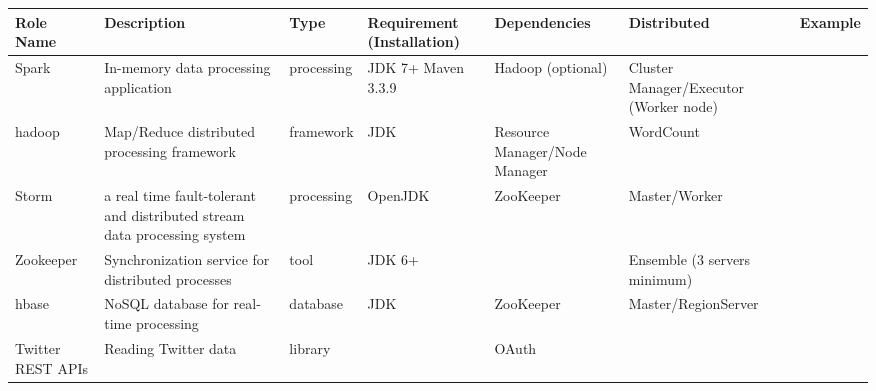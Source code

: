 \documentclass[9pt,twocolumn,twoside]{styles/osajnl}
\begin{document}
\begin{table}[htb]
  \begin{center}
    \begin{small}
      \begin{tabular}{l|m{3cm}|l|m{2cm}|m{2cm}|m{2cm}|m{2cm}}

	Role Name & Description & Type & Requirement (Installation) & Dependencies & Distributed & Example \tabularnewline \hline \hline
	Spark & In-memory data processing application & processing & JDK 7+ Maven 3.3.9 & Hadoop (optional) & 	Cluster Manager/Executor (Worker node) & 	  \\ \hline

	hadoop & 
	Map/Reduce distributed processing framework & 
	framework & 
	JDK & 
	Resource Manager/Node Manager & 
	WordCount &   \\ \hline

	Storm & 
	a real time fault-tolerant and distributed stream data processing system & 
	processing & 
	OpenJDK & 
	ZooKeeper &
	Master/Worker &
	\\ \hline

	Zookeeper & 
	Synchronization service for distributed processes & 
	tool & 
	JDK 6+ &  & 
	Ensemble (3 servers minimum) & 
	\\ \hline

	hbase & 
	NoSQL database for real-time processing & 
	database & 
	JDK & 
	ZooKeeper & 
	Master/RegionServer & 
\\ \hline

	Twitter REST APIs & Reading Twitter data & library & 	 & OAuth & &  \\ \hline
	

\end{tabular}
\end{small}
\end{center}
\end{table}
\end{document}
